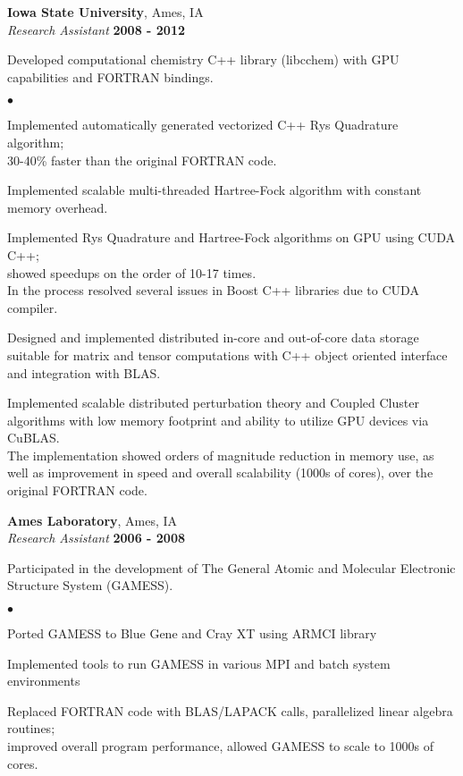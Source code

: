 \documentclass[overlap,line]{cv}
\newenvironment{list2}{
  \begin{list}{$\bullet$}{%
      \setlength{\itemsep}{0in}
      \setlength{\parsep}{0in} \setlength{\parskip}{0in}
      \setlength{\topsep}{0in} \setlength{\partopsep}{0in} 
      \setlength{\leftmargin}{0.2in}}}{\end{list}}
\begin{document}
\begin{resume}
{\bf Iowa State University}, Ames, IA \\
{\it Research Assistant} \hfill {\bf 2008 - 2012}

Developed computational chemistry C++ library (libcchem) with GPU capabilities
and FORTRAN bindings.
\vspace{.05in}
\begin{list2}
\item Implemented automatically generated vectorized C++ Rys Quadrature algorithm; \\
  30-40\% faster than the original FORTRAN code.
\item Implemented scalable multi-threaded Hartree-Fock algorithm with constant memory overhead.
\item Implemented Rys Quadrature and Hartree-Fock algorithms on GPU using CUDA C++; \\
  showed speedups on the order of 10-17 times.\\
  In the process resolved several issues in Boost C++ libraries due to CUDA compiler.
\item Designed and implemented distributed in-core and out-of-core
  data storage suitable for matrix and tensor computations with C++
  object oriented interface and integration with BLAS.
\item Implemented scalable distributed perturbation theory and Coupled Cluster
  algorithms with low memory footprint and ability to utilize GPU devices via CuBLAS. \\
  The implementation showed orders of magnitude reduction in memory use, as
  well as improvement in speed and overall scalability (1000s of cores),
  over the original FORTRAN code.
\end{list2}


{\bf Ames Laboratory}, Ames, IA \\
{\it Research Assistant} \hfill {\bf 2006 - 2008}

Participated in the development of The General Atomic and Molecular Electronic Structure System
(GAMESS).
\vspace{.05in}
\begin{list2}
\item Ported GAMESS to Blue Gene and Cray XT using ARMCI library
\item Implemented tools to run GAMESS in various MPI and batch system environments
\item Replaced FORTRAN code with BLAS/LAPACK calls, parallelized linear algebra routines; \\
  improved overall program performance, allowed GAMESS to scale to 1000s of cores.
\end{list2}



\end{resume}
\end{document}
